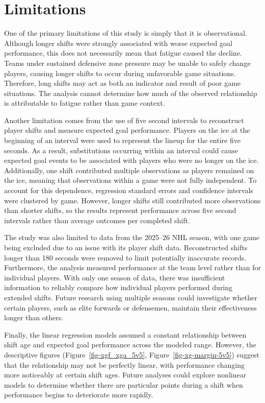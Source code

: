 \documentclass[
  12pt]{article}
\begin{document}
\section{Limitations}\label{limitations}

One of the primary limitations of this study is simply that it is
observational. Although longer shifts were strongly associated with
worse expected goal performance, this does not necessarily mean that
fatigue caused the decline. Teams under sustained defensive zone
pressure may be unable to safely change players, causing longer shifts
to occur during unfavorable game situations. Therefore, long shifts may
act as both an indicator and result of poor game situations. The
analysis cannot determine how much of the observed relationship is
attributable to fatigue rather than game context.

Another limitation comes from the use of five second intervals to
reconstruct player shifts and measure expected goal performance. Players
on the ice at the beginning of an interval were used to represent the
lineup for the entire five seconds. As a result, substitutions occurring
within an interval could cause expected goal events to be associated
with players who were no longer on the ice. Additionally, one shift
contributed multiple observations as players remained on the ice,
meaning that observations within a game were not fully independent. To
account for this dependence, regression standard errors and confidence
intervals were clustered by game. However, longer shifts still
contributed more observations than shorter shifts, so the results
represent performance across five second intervals rather than average
outcomes per completed shift.

The study was also limited to data from the 2025--26 NHL season, with
one game being excluded due to an issue with its player shift data.
Reconstructed shifts longer than 180 seconds were removed to limit
potentially inaccurate records. Furthermore, the analysis measured
performance at the team level rather than for individual players. With
only one season of data, there was insufficient information to reliably
compare how individual players performed during extended shifts. Future
research using multiple seasons could investigate whether certain
players, such as elite forwards or defensemen, maintain their
effectiveness longer than others.

Finally, the linear regression models assumed a constant relationship
between shift age and expected goal performance across the modeled
range. However, the descriptive figures (Figure~\ref{fig-xgf_xga_5v5},
Figure~\ref{fig-xg-margin-5v5}) suggest that the relationship may not be
perfectly linear, with performance changing more noticeably at certain
shift ages. Future analyses could explore nonlinear models to determine
whether there are particular points during a shift when performance
begins to deteriorate more rapidly.
\end{document}
